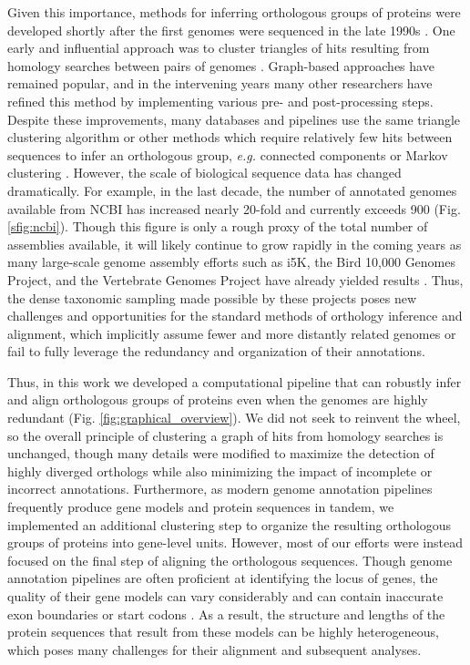 \documentclass[10pt,letterpaper]{article}
\begin{document}
Given this importance, methods for inferring orthologous groups of proteins were developed shortly after the first genomes were sequenced in the late 1990s \cite{Fleischmann1995, Goffeau1996, CESC1998}. One early and influential approach was to cluster triangles of hits resulting from homology searches between pairs of genomes \cite{Tatusov1997}. Graph-based approaches have remained popular, and in the intervening years many other researchers have refined this method by implementing various pre- and post-processing steps. Despite these improvements, many databases and pipelines use the same triangle clustering algorithm or other methods which require relatively few hits between sequences to infer an orthologous group, \textit{e.g.} connected components or Markov clustering \cite{Remm2001, Li2003, Jensen2007, Linard2011, Emms2015, Train2017, Cosentino2018}. However, the scale of biological sequence data has changed dramatically. For example, in the last decade, the number of annotated genomes available from NCBI has increased nearly 20-fold and currently exceeds 900 (Fig. \ref{sfig:ncbi}). Though this figure is only a rough proxy of the total number of assemblies available, it will likely continue to grow rapidly in the coming years as many large-scale genome assembly efforts such as i5K, the Bird 10,000 Genomes Project, and the Vertebrate Genomes Project have already yielded results \cite{Thomas2020, Feng2020, Rhie2021}. Thus, the dense taxonomic sampling made possible by these projects poses new challenges and opportunities for the standard methods of orthology inference and alignment, which implicitly assume fewer and more distantly related genomes or fail to fully leverage the redundancy and organization of their annotations.

Thus, in this work we developed a computational pipeline that can robustly infer and align orthologous groups of proteins even when the genomes are highly redundant (Fig. \ref{fig:graphical_overview}). We did not seek to reinvent the wheel, so the overall principle of clustering a graph of hits from homology searches is unchanged, though many details were modified to maximize the detection of highly diverged orthologs while also minimizing the impact of incomplete or incorrect annotations. Furthermore, as modern genome annotation pipelines frequently produce gene models and protein sequences in tandem, we implemented an additional clustering step to organize the resulting orthologous groups of proteins into gene-level units. However, most of our efforts were instead focused on the final step of aligning the orthologous sequences. Though genome annotation pipelines are often proficient at identifying the locus of genes, the quality of their gene models can vary considerably and can contain inaccurate exon boundaries or start codons \cite{Frankish2015, Dunne2018}. As a result, the structure and lengths of the protein sequences that result from these models can be highly heterogeneous, which poses many challenges for their alignment and subsequent analyses.
\end{document}
